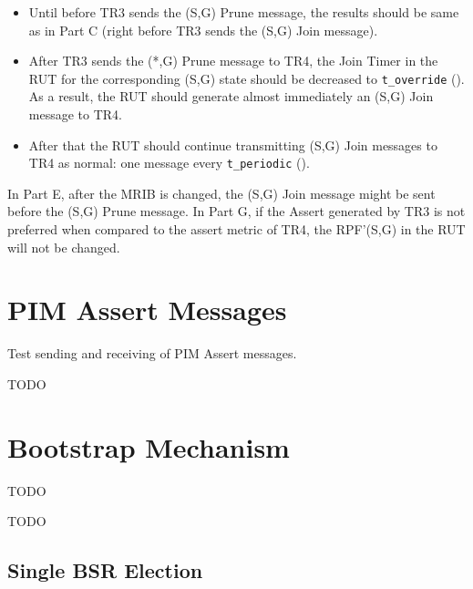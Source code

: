 \documentclass[11pt]{report}
\begin{document}

\begin{itemize}

  \item Until before TR3 sends the (S,G) Prune message, the results should
  be same as in Part C (right before TR3 sends the (S,G) Join message).

  \item After TR3 sends the (*,G) Prune message to TR4,
  the Join Timer in the RUT for the corresponding (S,G) state
  should be decreased to \verb=t_override= ({\PimsmTOverride}). As a result,
  the RUT should generate almost immediately an (S,G) Join message to TR4.

  \item After that the RUT should continue transmitting 
  (S,G) Join messages to TR4 as normal: one message every \verb=t_periodic=
  ({\PimsmTPeriodic}).

\end{itemize}


In Part E, after the MRIB is changed, the (S,G) Join message might
be sent before the (S,G) Prune message. In Part G, if the Assert generated by
TR3 is not preferred when compared to the assert metric of TR4, the RPF'(S,G)
in the RUT will not be changed.




\chapter{PIM Assert Messages}

Test sending and receiving of PIM Assert messages.

TODO


\chapter{Bootstrap Mechanism}

TODO

TODO

\newpage
\section{Single BSR Election}
\end{document}
